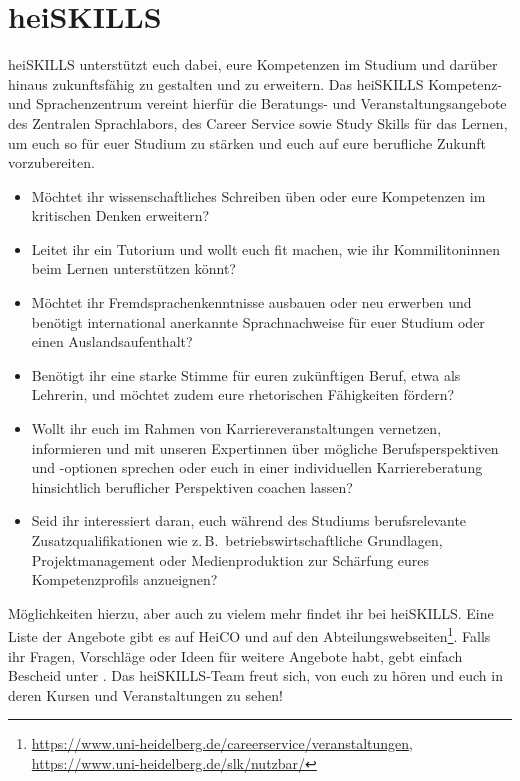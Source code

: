 \section{heiSKILLS}

heiSKILLS unterstützt euch dabei, eure Kompetenzen im Studium und darüber hinaus zukunftsfähig zu gestalten und zu erweitern. Das heiSKILLS Kompetenz- und Sprachenzentrum vereint hierfür die Beratungs- und Veranstaltungsangebote des Zentralen Sprachlabors, des Career Service sowie Study Skills für das Lernen, um euch so für euer Studium zu stärken und euch auf eure berufliche Zukunft vorzubereiten.

\begin{itemize}[leftmargin=3mm]
  \item Möchtet ihr wissenschaftliches Schreiben üben oder eure Kompetenzen im kritischen Denken erweitern?
  \item Leitet ihr ein Tutorium und wollt euch fit machen, wie ihr Kommilitoninnen beim Lernen unterstützen könnt?
  \item Möchtet ihr Fremdsprachenkenntnisse ausbauen oder neu erwerben und benötigt international anerkannte Sprachnachweise für euer Studium oder einen Auslandsaufenthalt?
  \item Benötigt ihr eine starke Stimme für euren zukünftigen Beruf, etwa als Lehrerin, und möchtet zudem eure rhetorischen Fähigkeiten fördern?
  \item Wollt ihr euch im Rahmen von Karriereveranstaltungen vernetzen, informieren und mit unseren Expertinnen über mögliche Berufsperspektiven und -optionen sprechen oder euch in einer individuellen Karriereberatung hinsichtlich beruflicher Perspektiven coachen lassen?
  \item Seid ihr interessiert daran, euch während des Studiums berufsrelevante Zusatzqualifikationen wie z.\,B.\, betriebswirtschaftliche Grundlagen, Projektmanagement oder Medienproduktion zur Schärfung eures Kompetenzprofils anzueignen?

\end{itemize}

Möglichkeiten hierzu, aber auch zu vielem mehr findet ihr bei heiSKILLS.
Eine Liste der Angebote gibt es auf HeiCO und auf den Abteilungswebseiten\footnote{\url{https://www.uni-heidelberg.de/careerservice/veranstaltungen}, \url{https://www.uni-heidelberg.de/slk/nutzbar/}}.
Falls ihr Fragen, Vorschläge oder Ideen für weitere Angebote habt, gebt einfach Bescheid unter . Das heiSKILLS-Team freut sich, von euch zu hören und euch in deren Kursen und Veranstaltungen zu sehen!
